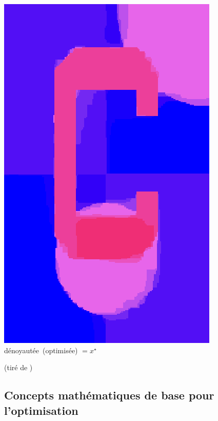 \documentclass[12pt]{beamer}
\begin{document}
\begin{frame}
\begin{itemize}
\begin{frame}
\begin{center}
\begin{minipage}[t]{0.2\textwidth}
\includegraphics[width=\textwidth]{c_denoised.png} \\
{\small \mbox{dénoyautée (optimisée)} $=x^\star$}
\end{minipage}
\mbox{\quad}
\end{center}
{\scriptsize (tiré de \cite{ravikumar17}) \hfill}
\end{frame}


\subsection{Concepts mathématiques de base pour l'optimisation}


\end{itemize}
\end{frame}
\end{document}
